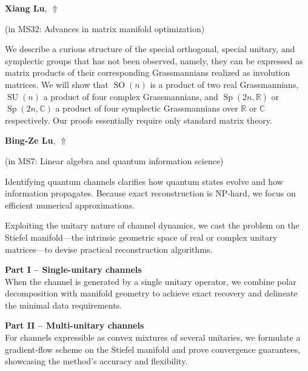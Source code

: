 \documentclass[ILAS2025-program.tex]{subfiles}
\begin{document}
\hypertarget{down0187}{}\begin{ilasabstract}
    
\textbf{Xiang Lu},  \hfill \hyperlink{up0187}{$\Uparrow$}
    
    
(in {\color{mstitle}MS32: Advances in matrix manifold optimization})
        
\mtskip
    We describe a curious structure of the special orthogonal, special unitary, and symplectic groups that has not been observed, namely, they can be expressed as matrix products of their corresponding Grassmannians realized as involution matrices. We will show that $\operatorname{SO}(n)$ is a product of two real Grassmannians, $\operatorname{SU}(n)$ a product of four complex Grassmannians, and $\operatorname{Sp}(2n, \mathbb{R})$ or $\operatorname{Sp}(2n, \mathbb{C})$ a product of four symplectic Grassmannians over $\mathbb{R}$ or $\mathbb{C}$ respectively. Our proofs essentially require only standard matrix theory.
\end{ilasabstract}
    

\hypertarget{down0206}{}\begin{ilasabstract}
    
\textbf{Bing-Ze Lu},  \hfill \hyperlink{up0206}{$\Uparrow$}
    
    
(in {\color{mstitle}MS7: Linear algebra and quantum information science})
        
\mtskip
    Identifying quantum channels clarifies how quantum states evolve and how information propagates. Because exact reconstruction is NP‑hard, we focus on efficient numerical approximations.

Exploiting the unitary nature of channel dynamics, we cast the problem on the Stiefel manifold—the intrinsic geometric space of real or complex unitary matrices---to devise practical reconstruction algorithms.

\textbf{Part I -- Single-unitary channels} \\
\noindent When the channel is generated by a single unitary operator, we combine polar decomposition with manifold geometry to achieve exact recovery and delineate the minimal data requirements.

\textbf{Part II -- Multi-unitary channels} \\
\noindent For channels expressible as convex mixtures of several unitaries, we formulate a gradient‑flow scheme on the Stiefel manifold and prove convergence guarantees, showcasing the method’s accuracy and flexibility.

\end{ilasabstract}
    
\end{document}
